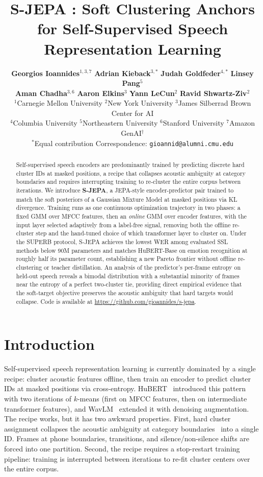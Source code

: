 \documentclass[9pt,twocolumn]{article}
\title{S-JEPA : Soft Clustering Anchors for Self-Supervised Speech Representation Learning}
\author{
  \textbf{Georgios Ioannides}$^{1,3,7}$ \quad
  \textbf{Adrian Kieback}$^{3,*}$ \quad
  \textbf{Judah Goldfeder}$^{4,*}$ \quad
  \textbf{Linsey Pang}$^{5}$\\
  \textbf{Aman Chadha}$^{3,6}$ \quad
  \textbf{Aaron Elkins}$^{3}$ \quad
  \textbf{Yann LeCun}$^{2}$ \quad
  \textbf{Ravid Shwartz-Ziv}$^{2}$\vspace{1em}\\
  {\small
  $^{1}$Carnegie Mellon University \quad
  $^{2}$New York University \quad
  $^{3}$James Silberrad Brown Center for AI\\
  $^{4}$Columbia University \quad
  $^{5}$Northeastern University \quad
  $^{6}$Stanford University \quad
  $^{7}$Amazon GenAI$^{\dagger}$ \vspace{0.5em}\\
  $^{*}$Equal contribution \quad Correspondence: \texttt{gioannid@alumni.cmu.edu}
  }
}
\date{}
\theoremstyle{plain}
\theoremstyle{definition}
\theoremstyle{remark}
\begin{document}
\maketitle
{}
\begin{abstract}

Self-supervised speech encoders are predominantly trained by predicting discrete hard cluster IDs at masked positions, a recipe that collapses acoustic ambiguity at category boundaries and requires interrupting training to re-cluster the entire corpus between iterations. We introduce \textbf{S-JEPA}, a JEPA-style encoder-predictor pair trained to match the soft posteriors of a Gaussian Mixture Model at masked positions via KL divergence. Training runs as one continuous optimization trajectory in two phases: a fixed GMM over MFCC features, then an \emph{online} GMM over encoder features, with the input layer selected adaptively from a label-free signal, removing both the offline re-cluster step and the hand-tuned choice of which transformer layer to cluster on. Under the SUPERB protocol, S-JEPA achieves the lowest WER among evaluated SSL methods below 90M parameters and matches HuBERT-Base on emotion recognition at roughly half its parameter count, establishing a new Pareto frontier without offline re-clustering or teacher distillation. An analysis of the predictor's per-frame entropy on held-out speech reveals a bimodal distribution with a substantial minority of frames near the entropy of a perfect two-cluster tie, providing direct empirical evidence that the soft-target objective preserves the acoustic ambiguity that hard targets would collapse. Code is available at \url{https://github.com/gioannides/s-jepa}.



\end{abstract}

\section{Introduction}


Self-supervised speech representation learning is currently dominated by a single recipe: cluster acoustic features offline, then train an encoder to predict cluster IDs at masked positions via cross-entropy. HuBERT~\citep{hsu2021hubert} introduced this pattern with two iterations of $k$-means (first on MFCC features, then on intermediate transformer features), and WavLM~\citep{chen2022wavlm} extended it with denoising augmentation. The recipe works, but it has two awkward properties. First, hard cluster assignment collapses the acoustic ambiguity at category boundaries~\citep{ladefoged2014course,stevens1998acoustic} into a single ID. Frames at phone boundaries, transitions, and silence/non-silence shifts are forced into one partition. Second, the recipe requires a stop-restart training pipeline: training is interrupted between iterations to re-fit cluster centers over the entire corpus.
\end{document}
